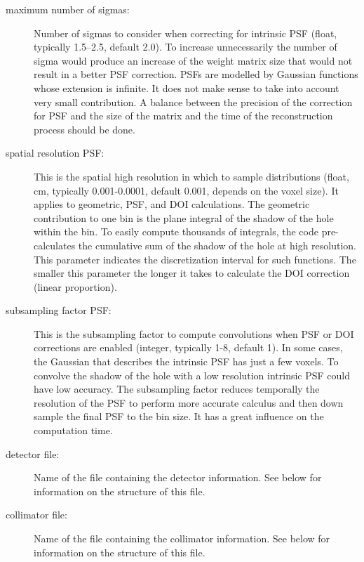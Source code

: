 \documentclass{article}
\begin{document}
{{\begin{description}

\item[maximum number of sigmas:] Number of sigmas to consider when correcting for intrinsic PSF (float, typically 1.5–2.5, default 2.0). To increase unnecessarily the number of sigma would produce an increase of the weight matrix size that would not result in a better PSF correction. PSFs are modelled by Gaussian functions whose extension is infinite. It does not make sense to take into account very small contribution. A balance between the precision of the correction for PSF and the size of the matrix and the time of the reconstruction process should be done.

\item[spatial resolution PSF:] This is the spatial high resolution in which to sample distributions (float, cm, typically 0.001-0.0001, default 0.001, depends on the voxel size). It applies to geometric, PSF, and DOI calculations. The geometric contribution to one bin is the plane integral of the shadow of the hole within the bin. To easily compute thousands of integrals, the code pre-calculates the cumulative sum of the shadow of the hole at high resolution. This parameter indicates the discretization interval for such functions. The smaller this parameter the longer it takes to calculate the DOI correction (linear proportion).

\item[subsampling factor PSF:] This is the subsampling factor to compute convolutions when PSF or DOI corrections are enabled (integer, typically 1-8, default 1). In some cases, the Gaussian that describes the intrinsic PSF has just a few voxels. To convolve the shadow of the hole with a low resolution intrinsic PSF could have low accuracy. The subsampling factor reduces temporally the resolution of the PSF to perform more accurate calculus and then down sample the final PSF to the bin size. It has a great influence on the computation time.

\item[detector file:] Name of the file containing the detector information. See below for information on the structure of this file.

\item[collimator file:] Name of the file containing the collimator information. See below for information on the structure of this file.


\end{description}}}
\end{document}
